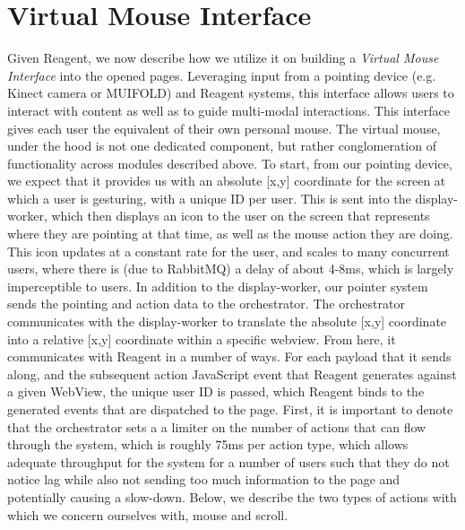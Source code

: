 \section{Virtual Mouse Interface}

Given Reagent, we now describe how we utilize it on building
a \textit{Virtual Mouse Interface} into the opened pages.
Leveraging input from a pointing device (e.g. Kinect camera or
MUIFOLD) and Reagent systems, this interface allows users to
interact with content as well as to guide multi-modal interactions.
This interface gives each user the equivalent of their own
personal mouse. The virtual mouse, under the hood is not one
dedicated component, but rather conglomeration of functionality
across modules described above. To start, from our pointing device,
we expect that it provides us with an absolute [x,y] coordinate for
the screen at which a user is gesturing, with a unique ID per user.
This is sent into the display-worker, which then displays an icon to
the user on the screen that represents where they are pointing at that
time, as well as the mouse action they are doing. This icon updates at a
constant rate for the user, and scales to many concurrent users, where
there is (due to RabbitMQ) a delay of about 4-8ms, which is largely
imperceptible to users. In addition to the display-worker, our pointer
system sends the pointing and action data to the orchestrator. The
orchestrator communicates with the display-worker to translate the
absolute [x,y] coordinate into a relative [x,y] coordinate within a
specific webview. From here, it communicates with Reagent in a number of
ways. For each payload that it sends along, and the subsequent action
JavaScript event that Reagent generates against a given WebView, the
unique user ID is passed, which Reagent binds to the generated events
that are dispatched to the page. First, it is important to denote that
the orchestrator sets a a limiter on the number of actions that can
flow through the system, which is roughly 75ms per action type, which
allows adequate throughput for the system for a number of users such
that they do not notice lag while also not sending too much information
to the page and potentially causing a slow-down. Below, we describe 
the two types of actions with which we concern ourselves with, mouse
and scroll.

